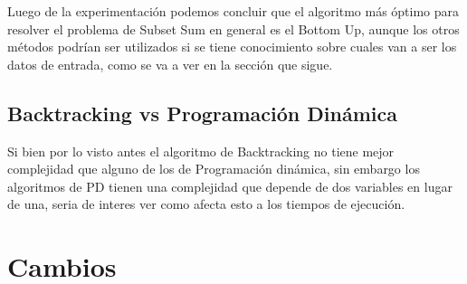 \documentclass[a4paper]{article}
\begin{document}
Luego de la experimentación podemos concluir que el algoritmo más óptimo para resolver el problema de Subset Sum en general es el Bottom Up, aunque los otros métodos podrían ser utilizados si se tiene conocimiento sobre cuales van a ser los datos de entrada, como se va a ver en la sección que sigue.

\subsection{Backtracking vs Programación Dinámica}

Si bien por lo visto antes el algoritmo de Backtracking no tiene mejor complejidad que alguno de los de Programación dinámica, sin embargo los algoritmos de PD tienen una complejidad que depende de dos variables en lugar de una, seria de interes ver como afecta esto a los tiempos de ejecución.



%

\section{Cambios}

\end{document}
